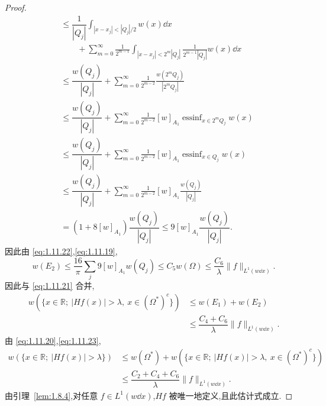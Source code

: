\begin{proof}
\begin{align*}
& \leq \dfrac{1}{|Q_{j}|}\displaystyle\int_{|x - x_{j}| < |Q_{j}|/2}w(x)\dd x \\
& \qquad + \displaystyle\sum_{m=0}^{\infty}\frac{1}{2^{m-1}}\int_{|x - x_{j}| < 2^{m}|Q_{j}|}\frac{1}{2^{m-1}|Q_{j}|}w(x)\dd x \\
& \leq \dfrac{w(Q_{j})}{|Q_{j}|} + \displaystyle\sum_{m=0}^{\infty}\frac{1}{2^{m-2}}\frac{w(2^{m}Q_{j})}{|2^{m}Q_{j}|} \\
& \leq \dfrac{w(Q_{j})}{|Q_{j}|} + \displaystyle\sum_{m=0}^{\infty}\frac{1}{2^{m-2}}[w]_{A_{1}}\operatorname{essinf}_{x \in 2^{m}Q_{j}}w(x) \\
& \leq \dfrac{w(Q_{j})}{|Q_{j}|} + \displaystyle\sum_{m=0}^{\infty}\frac{1}{2^{m-2}}[w]_{A_{1}}\operatorname{essinf}_{x \in Q_{j}}w(x) \\
& \leq \dfrac{w(Q_{j})}{|Q_{j}|} + \displaystyle\sum_{m=0}^{\infty}\frac{1}{2^{m-2}}[w]_{A_{1}}\frac{w(Q_{j})}{|Q_{j}|} \\
& = (1 + 8[w]_{A_{1}})\dfrac{w(Q_{j})}{|Q_{j}|} \leq 9[w]_{A_{1}}\dfrac{w(Q_{j})}{|Q_{j}|}.
\end{align*}
因此由 \eqref{eq:1.11.22},\eqref{eq:1.11.19},
\begin{equation*}
w(E_{2}) \leq \frac{16}{\pi}\sum_{j}9[w]_{A_{1}}w(Q_{j}) \leq C_{5}w(\Omega) \leq \frac{C_{6}}{\lambda}\| f \|_{L^{1}(w\dd x)}.
\end{equation*}
因此与 \eqref{eq:1.11.21} 合并,
\begin{equation}\tag{1.11.23}\begin{aligned}
w(\{x \in \mathbb{R};\ |Hf(x)| > \lambda,\ x \in (\Omega^{*})^{c}\}) & \leq w(E_{1}) + w(E_{2}) \\
& \leq \dfrac{C_{4} + C_{6}}{\lambda}\| f \|_{L^{1}(w\dd x)}.
\end{aligned}\label{eq:1.11.23}\end{equation}
由 \eqref{eq:1.11.20},\eqref{eq:1.11.23},
\begin{align*}
w(\{x \in \mathbb{R};\ |Hf(x)| > \lambda\}) & \leq w(\Omega^{*}) + w(\{x \in \mathbb{R};\ |Hf(x)| > \lambda,\ x \in (\Omega^{*})^{c}\}) \\
& \leq \dfrac{C_{2} + C_{4} + C_{6}}{\lambda}\| f \|_{L^{1}(w\dd x)}.
\end{align*}
由引理~\ref{lem:1.8.4},对任意 $f \in L^{1}(w\dd x)$,$Hf$ 被唯一地定义,且此估计式成立.
\end{proof}
